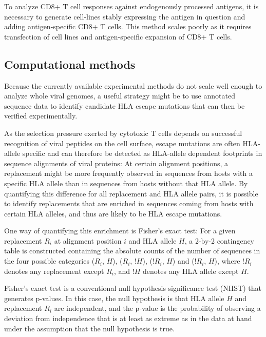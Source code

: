 \documentclass[fleqn,11pt]{SelfArx} %
\begin{document}
To analyze CD8+ T cell responses against endogenously processed antigens, it is necessary to generate cell-lines stably expressing the antigen in question and adding antigen-specific CD8+ T cells. This method scales poorly as it requires transfection of cell lines and antigen-specific expansion of CD8+ T cells.

\subsection{Computational methods}

Because the currently available experimental methods do not scale well enough to analyze whole viral genomes, a useful strategy might be to use annotated sequence data to identify candidate HLA escape mutations that can then be verified experimentally.

As the selection pressure exerted by cytotoxic T cells depends on successful recognition of viral peptides on the cell surface, escape mutations are often HLA-allele specific and can therefore be detected as HLA-allele dependent footprints in sequence alignments of viral proteins\nolinebreak\cite{Moore2002}: At certain alignment positions, a replacement might be more frequently observed in sequences from hosts with a specific HLA allele than in  sequences from hosts without that HLA allele. By quantifying this difference for all replacement and HLA allele pairs, it is possible to identify replacements that are enriched in sequences coming from hosts with certain HLA alleles, and thus are likely to be HLA escape mutations.

One way of quantifying this enrichment is Fisher's exact test\nolinebreak\cite{Fisher1922}: For a given replacement \(R_{i}\) at alignment position \(i\) and HLA allele \(H\), a 2-by-2 contingency table is constructed containing the absolute counts of the number of sequences in the four possible categories  (\(R_{i}\), \(H\)), (\(R_{i}\), \(!H\)), (\(!R_{i}\), \(H\)) and (\(!R_{i}\), \(H\)), where \(!R_{i}\) denotes any replacement except \(R_{i}\), and \(!H\) denotes any HLA allele except \(H\).

Fisher's exact test is a conventional null hypothesis significance test (NHST) that generates p-values. In this case, the null hypothesis is that HLA allele \(H\) and  replacement \(R_{i}\) are independent, and the p-value is the probability of observing a deviation from independence that is at least as extreme as in the data at hand under the assumption that the null hypothesis is true.
\end{document}
